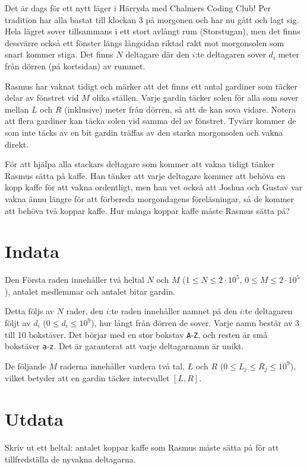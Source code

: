 
Det är dags för ett nytt läger i Härryda med Chalmers Coding Club! Per tradition har alla bastat till klockan 3 på
morgonen och har nu gått och lagt sig. Hela lägret sover tillsammans i ett stort avlångt rum (Storstugan), men det finns dessvärre
också ett fönster längs långsidan riktad rakt mot morgonsolen som snart kommer stiga. Det finns $N$ deltagare där den $i$:te deltagaren
sover $d_i$ meter från dörren (på kortsidan) av rummet.


Rasmus har vaknat tidigt och märker att det finns ett antal gardiner som täcker delar av fönstret vid $M$ olika ställen.
Varje gardin täcker solen för alla som sover mellan $L$ och $R$ (inklusive) meter från dörren, så att de kan sova vidare.
Notera att flera gardiner kan täcka solen vid samma del av fönstret.
Tyvärr kommer de som inte täcks av en bit gardin träffas av den starka morgonsolen och vakna direkt.

För att hjälpa alla stackars deltagare som kommer att vakna tidigt tänker Rasmus sätta på kaffe. Han tänker att varje
deltagare kommer att behöva en kopp kaffe för att vakna ordentligt, men han vet också att Joshua och Gustav
var vakna ännu längre för att förbereda morgondagens föreläsningar, så de kommer att behöva två koppar kaffe. Hur
många koppar kaffe måste Rasmus sätta på?


\section*{Indata}
Den Första raden innehåller två heltal $N$ och $M$ ($1 \le N \le 2 \cdot 10^5$, $0 \leq M \leq 2 \cdot 10^5$), antalet medlemmar och antalet bitar gardin.

Detta följs av $N$ rader, den $i$:te raden innehåller namnet på den $i$:te deltagaren följt av $d_i$ ($0 \le d_i \le 10^9$), hur långt
från dörren de sover. Varje namn består av 3 till 10 bokstäver. Det börjar med en stor bokstav \texttt{A}-\texttt{Z}, och resten är små bokstäver \texttt{a}-\texttt{z}.
Det är garanterat att varje deltagarnamn är unikt.

De följande $M$ raderna innehåller vardera två tal, $L$ och $R$ ($0 \le L_j \le R_j \le 10^9$),
vilket betyder att en gardin täcker intervallet $[L, R]$.

\section*{Utdata}
Skriv ut ett heltal: antalet koppar kaffe som Rasmus måste sätta på för att tillfredställa de nyvakna deltagarna.

